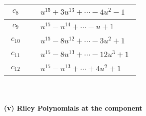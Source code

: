 \documentclass[1p]{elsarticle_modified}
\theoremstyle{definition}
\begin{document}
\begin{tabular}{m{50pt}|m{274pt}}
\hline $$\begin{aligned}c_{8}\end{aligned}$$&$\begin{aligned}
&u^{15}+3 u^{13}+\cdots-4 u^2-1
\end{aligned}$\\
\hline $$\begin{aligned}c_{9}\end{aligned}$$&$\begin{aligned}
&u^{15}- u^{14}+\cdots- u+1
\end{aligned}$\\
\hline $$\begin{aligned}c_{10}\end{aligned}$$&$\begin{aligned}
&u^{15}-8 u^{12}+\cdots-3 u^2+1
\end{aligned}$\\
\hline $$\begin{aligned}c_{11}\end{aligned}$$&$\begin{aligned}
&u^{15}-8 u^{13}+\cdots-12 u^3+1
\end{aligned}$\\
\hline $$\begin{aligned}c_{12}\end{aligned}$$&$\begin{aligned}
&u^{15}- u^{13}+\cdots+4 u^2+1
\end{aligned}$\\
\hline
\end{tabular}\\~\\
\newpage\renewcommand{\arraystretch}{1}
\flushleft \textbf{(v) Riley Polynomials at the component}\newline \\
\end{document}
